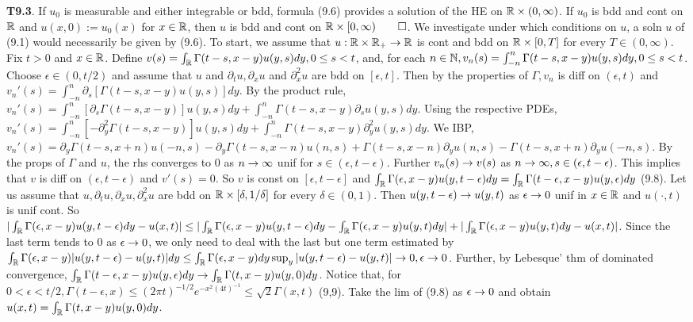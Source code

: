 {\bf T9.3}. If $u_0$ is measurable and either integrable or bdd, formula (9.6) provides a solution of the HE on $\mathbb{R} \times (0, \infty)$.  If $u_0$ is bdd and cont on $\mathbb{R}$ and $u(x,0):=u_0(x)$ for $x \in \mathbb{R}$, then $u$ is bdd and cont on $\mathbb{R} \times [0, \infty) \qed$. We investigate under which conditions on $u$, a soln $u$ of (9.1) would  necessarily be given by (9.6). To start, we assume that $u: \mathbb{R} \times \mathbb{R}_+ \rightarrow \mathbb{R}$ is cont and bdd on $\mathbb{R} \times [0, T]$ for every $T \in (0, \infty)$. Fix $t > 0$ and $x \in \mathbb{R}$. Define $v(s) = \int_{\mathbb{R}} \Gamma(t-s, x-y) u(y,s)dy, 0 \leq s < t$, and, for each $n \in \mathbb{N}, v_n(s) = \int_{-n}^n \Gamma(t-s, x-y) u(y,s)dy, 0 \leq s < t$.  Choose $\epsilon \in (0, t/2)$ and assume that $u$ and $\partial_t u, \partial_x u$ and $\partial_x^2 u$ are bdd on $[\epsilon, t]$. Then by the properties of $\Gamma, v_n$ is diff on $(\epsilon, t)$ and $v_n'(s) = \int_{-n}^n \partial_s [ \Gamma(t-s, x-y) u(y,s)]dy$. By the product rule, $v_n'(s) = \int_{-n}^n [\partial_s  \Gamma(t-s, x-y)] u(y,s)dy + \int_{-n}^n  \Gamma(t-s, x-y) \partial_s u(y,s)dy $. Using the respective PDEs, $v_n'(s) = \int_{-n}^n [-\partial_y^2  \Gamma(t-s, x-y)] u(y,s)dy + \int_{-n}^n  \Gamma(t-s, x-y) \partial_y^2 u(y,s)dy $.  We IBP, $v_n'(s) = \partial_y  \Gamma(t-s, x+n) u(-n,s) - \partial_y  \Gamma(t-s, x-n) u(n,s) +   \Gamma(t-s, x-n) \partial_y u(n,s)  - \Gamma(t-s, x+n) \partial_y u(-n,s)$. By the props of $\Gamma$ and $u$, the rhs converges to 0 as $n \rightarrow \infty$ unif for $s \in (\epsilon, t-\epsilon)$. Further $v_n(s) \rightarrow v(s)$ as $n \rightarrow \infty, s \in (\epsilon, t-\epsilon)$. This implies that $v$ is diff on $(\epsilon, t-\epsilon)$ and $v'(s) = 0$. So $v$ is const on $[\epsilon, t-\epsilon]$ and $\int_{\mathbb{R}} \Gamma(\epsilon, x-y)u(y, t-\epsilon)dy = \int_{\mathbb{R}} \Gamma(t- \epsilon, x-y)u(y, \epsilon)dy$ (9.8). Let us assume that $u, \partial_t u, \partial_x u, \partial_x^2 u$ are bdd on $\mathbb{R} \times [\delta, 1/\delta]$ for every $\delta \in (0,1)$. Then $u(y, t-\epsilon) \rightarrow u(y,t)$ as $\epsilon \rightarrow 0$ unif in $x \in \mathbb{R}$ and $u(\cdot, t)$ is unif cont.  So $|\int_{\mathbb{R}} \Gamma(\epsilon, x-y)u(y, t-\epsilon)dy - u(x,t)| \leq |\int_{\mathbb{R}} \Gamma(\epsilon, x-y)u(y, t-\epsilon)dy - \int_{\mathbb{R}} \Gamma(\epsilon, x-y)u(y, t)dy| + | \int_{\mathbb{R}} \Gamma(\epsilon, x-y)u(y, t)dy - u(x,t)|$. Since the last term tends to 0 as $\epsilon \rightarrow 0$, we only need to deal with the last but one term estimated by $\int_{\mathbb{R}} \Gamma(\epsilon, x-y)|u(y, t- \epsilon)- u(y,t)|dy \leq \int_{\mathbb{R}} \Gamma(\epsilon, x-y) dy \sup_y|u(y, t- \epsilon)- u(y,t)| \rightarrow 0, \epsilon \rightarrow 0$. Further, by Lebesque' thm of dominated convergence, $\int_{\mathbb{R}} \Gamma(t- \epsilon, x-y) u(y, \epsilon)dy \rightarrow \int_{\mathbb{R}} \Gamma (t, x-y) u(y,0) dy$. Notice that, for $0< \epsilon < t/2, \Gamma( t- \epsilon, x) \leq (2 \pi t)^{-1/2}e^{-x^2(4t)^{-1}} \leq \sqrt{2} \Gamma(x,t)$ (9,9). Take the lim of (9.8) as $\epsilon \rightarrow 0$ and obtain $u(x,t) = \int_{\mathbb{R}} \Gamma(t, x-y) u(y,0)dy$. 